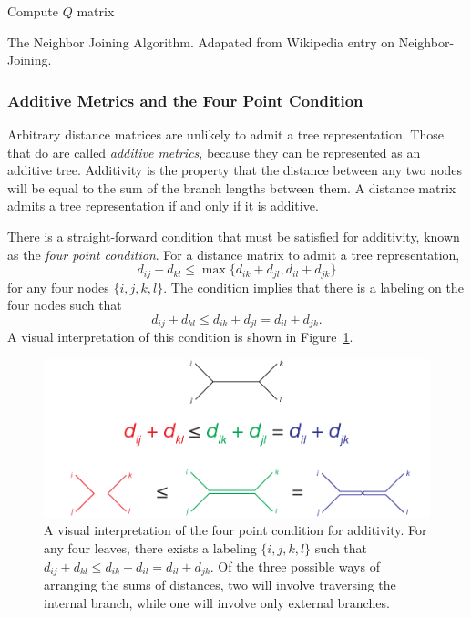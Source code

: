 \begin{algorithm}
     {
        Compute $Q$ matrix\;
    }
    \caption{The Neighbor Joining Algorithm. Adapated from Wikipedia entry on Neighbor-Joining.}
    \label{bg:alg:nj}
\end{algorithm}

\subsubsection{Additive Metrics and the Four Point Condition}
\label{bg:bio:phylo:additivity}

Arbitrary distance matrices are unlikely to admit a tree representation.
Those that do are called \emph{additive metrics}, because they can be represented as an additive tree.
Additivity is the property that the distance between any two nodes will be equal to the sum of the branch lengths between them.
A distance matrix admits a tree representation if and only if it is additive.

There is a straight-forward condition that must be satisfied for additivity, known as the \emph{four point condition}.
For a distance matrix to admit a tree representation, 
\begin{equation}
d_{ij} + d_{kl} \leq \max\{d_{ik} + d_{jl} ,  d_{il} + d_{jk} \}
\end{equation}
for any four nodes $\{i,j,k,l\}$.
The condition implies that there is a labeling on the four nodes such that
\begin{equation}
d_{ij} + d_{kl} \leq d_{ik} + d_{jl} =  d_{il} + d_{jk}.
\end{equation}
A visual interpretation of this condition is shown in Figure~\ref{background:fig:four_point_condition}.

\begin{figure}
\centering
\includegraphics[]{./fig/background/four_point_condition.pdf}
\caption[The four point condition for additivity]{A visual interpretation of the four point condition for additivity. For any four leaves, there exists a labeling $\{i,j,k,l\}$ such that $d_{ij}+d_{kl}\leq d_{ik}+d_{il} = d_{il}+d_{jk}$. Of the three possible ways of arranging the sums of distances, two will involve traversing the internal branch, while one will involve only external branches.}
\label{background:fig:four_point_condition}
\end{figure}

